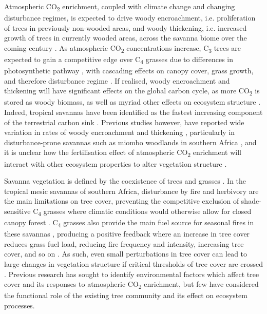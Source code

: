 \documentclass[11pt,a4paper]{article}
\begin{document}
Atmospheric CO\textsubscript{2} enrichment, coupled with climate change and changing disturbance regimes, is expected to drive woody encroachment, i.e. proliferation of trees in previously non-wooded areas, and woody thickening, i.e. increased growth of trees in currently wooded areas, across the savanna biome over the coming century \citep{Criado2020, Stevens2016, Mitchard2013}. As atmospheric CO\textsubscript{2} concentrations increase, C\textsubscript{3} trees are expected to gain a competitive edge over C\textsubscript{4} grasses due to differences in photosynthetic pathway \citep{Buitenwerf2012}, with cascading effects on canopy cover, grass growth, and therefore disturbance regime \citep{Bond2012}. If realised, woody encroachment and thickening will have significant effects on the global carbon cycle, as more CO\textsubscript{2} is stored as woody biomass, as well as myriad other effects on ecosystem structure \citep{Donohue2013}. Indeed, tropical savannas have been identified as the fastest increasing component of the terrestrial carbon sink \citep{Sitch2015}. Previous studies however, have reported wide variation in rates of woody encroachment and thickening \citep{Mitchard2013}, particularly in disturbance-prone savannas such as miombo woodlands in southern Africa \citep{Lewis2009}, and it is unclear how the fertilisation effect of atmospheric CO\textsubscript{2} enrichment will interact with other ecosystem properties to alter vegetation structure \citep{Korner2017, Reich2014}.

Savanna vegetation is defined by the coexistence of trees and grasses \citep{Scholes1997}. In the tropical mesic savannas of southern Africa, disturbance by fire and herbivory are the main limitations on tree cover, preventing the competitive exclusion of shade-sensitive C\textsubscript{4} grasses where climatic conditions would otherwise allow for closed canopy forest \citep{Sankaran2005}. C\textsubscript{4} grasses also provide the main fuel source for seasonal fires in these savannas \citep{Frost1996}, producing a positive feedback where an increase in tree cover reduces grass fuel load, reducing fire frequency and intensity, increasing tree cover, and so on \citep{Staver2015}. As such, even small perturbations in tree cover can lead to large changes in vegetation structure if critical thresholds of tree cover are crossed \citep{Hirota2011}. Previous research has sought to identify environmental factors which affect tree cover and its responses to atmospheric CO\textsubscript{2} enrichment, but few have considered the functional role of the existing tree community and its effect on ecosystem processes.
\end{document}
